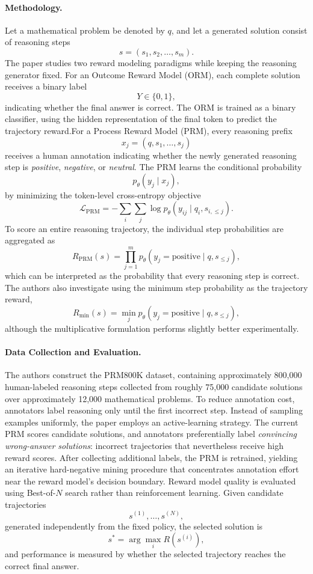 \documentclass[11pt]{article}
\begin{document}
\paragraph{Methodology.}
Let a mathematical problem be denoted by \(q\), and let a generated solution consist of reasoning steps
\[
s=(s_1,s_2,\ldots,s_m).
\]
The paper studies two reward modeling paradigms while keeping the reasoning generator fixed.
For an Outcome Reward Model (ORM), each complete solution receives a binary label
\[
Y\in\{0,1\},
\]
indicating whether the final answer is correct. The ORM is trained as a binary classifier, using the hidden representation of the final token to predict the trajectory reward.For a Process Reward Model (PRM), every reasoning prefix
\[
x_j=(q,s_1,\ldots,s_j)
\]
receives a human annotation indicating whether the newly generated reasoning step is \emph{positive}, \emph{negative}, or \emph{neutral}. The PRM learns the conditional probability
\[
p_\theta(y_j\mid x_j),
\]
by minimizing the token-level cross-entropy objective
\[
\mathcal{L}_{\mathrm{PRM}}
=
-\sum_i\sum_j
\log p_\theta(y_{ij}\mid q_i,s_{i,\le j}).
\]
To score an entire reasoning trajectory, the individual step probabilities are aggregated as
\[
R_{\mathrm{PRM}}(s)
=
\prod_{j=1}^{m}
p_\theta(y_j=\mathrm{positive}\mid q,s_{\le j}),
\]
which can be interpreted as the probability that every reasoning step is correct. The authors also investigate using the minimum step probability as the trajectory reward,
\[
R_{\min}(s)
=
\min_j
p_\theta(y_j=\mathrm{positive}\mid q,s_{\le j}),
\]
although the multiplicative formulation performs slightly better experimentally.

\paragraph{Data Collection and Evaluation.}
The authors construct the PRM800K dataset, containing approximately 800,000 human-labeled reasoning steps collected from roughly 75,000 candidate solutions over approximately 12,000 mathematical problems. To reduce annotation cost, annotators label reasoning only until the first incorrect step.
Instead of sampling examples uniformly, the paper employs an active-learning strategy. The current PRM scores candidate solutions, and annotators preferentially label \emph{convincing wrong-answer solutions}: incorrect trajectories that nevertheless receive high reward scores. After collecting additional labels, the PRM is retrained, yielding an iterative hard-negative mining procedure that concentrates annotation effort near the reward model's decision boundary.
Reward model quality is evaluated using Best-of-\(N\) search rather than reinforcement learning. Given candidate trajectories
\[
s^{(1)},\ldots,s^{(N)},
\]
generated independently from the fixed policy, the selected solution is
\[
s^*
=
\arg\max_i R(s^{(i)}),
\]
and performance is measured by whether the selected trajectory reaches the correct final answer.
\end{document}
